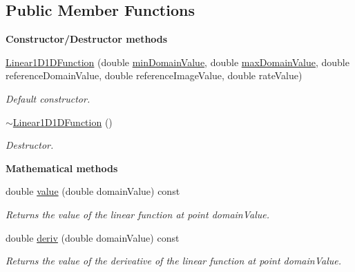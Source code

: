 \subsection*{Public Member Functions}
\begin{Indent}{\bf Constructor/\-Destructor methods}\par
\begin{DoxyCompactItemize}
\item 
\hyperlink{class_q_u_e_s_o_1_1_linear1_d1_d_function_ac1a758903e8abd0b4268e53dac889258}{Linear1\-D1\-D\-Function} (double \hyperlink{class_q_u_e_s_o_1_1_base1_d1_d_function_a4c110e621ef1ac557bbcc60d41f5a3c2}{min\-Domain\-Value}, double \hyperlink{class_q_u_e_s_o_1_1_base1_d1_d_function_ad2b80d0c52c0cb56c89f70f30b3bb19e}{max\-Domain\-Value}, double reference\-Domain\-Value, double reference\-Image\-Value, double rate\-Value)
\begin{DoxyCompactList}\small\item\em Default constructor. \end{DoxyCompactList}\item 
\hyperlink{class_q_u_e_s_o_1_1_linear1_d1_d_function_aaac97ac307dadf156b496b9f9b8e5d06}{$\sim$\-Linear1\-D1\-D\-Function} ()
\begin{DoxyCompactList}\small\item\em Destructor. \end{DoxyCompactList}\end{DoxyCompactItemize}
\end{Indent}
\begin{Indent}{\bf Mathematical methods}\par
\begin{DoxyCompactItemize}
\item 
double \hyperlink{class_q_u_e_s_o_1_1_linear1_d1_d_function_a4264993c026b0a55af32131027c923ff}{value} (double domain\-Value) const 
\begin{DoxyCompactList}\small\item\em Returns the value of the linear function at point {\ttfamily domain\-Value}. \end{DoxyCompactList}\item 
double \hyperlink{class_q_u_e_s_o_1_1_linear1_d1_d_function_abd3ccc80ea449d8a20afb2efc22b131a}{deriv} (double domain\-Value) const 
\begin{DoxyCompactList}\small\item\em Returns the value of the derivative of the linear function at point {\ttfamily domain\-Value}. \end{DoxyCompactList}\end{DoxyCompactItemize}
\end{Indent}
